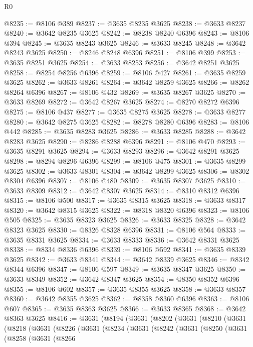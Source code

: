 \begin{lexlean}{R0}
\begin{coremodule}
@8235 := @8106 @389
@8237 := @3635 @8235 @3625
@8238 := @3633 @8237
@8240 := @3642 @8235 @3625
@8242 := @8238 @8240 @6396
@8243 := @8106 @394
@8245 := @3635 @8243 @3625
@8246 := @3633 @8245
@8248 := @3642 @8243 @3625
@8250 := @8246 @8248 @6396
@8251 := @8106 @399
@8253 := @3635 @8251 @3625
@8254 := @3633 @8253
@8256 := @3642 @8251 @3625
@8258 := @8254 @8256 @6396
@8259 := @8106 @427
@8261 := @3635 @8259 @3625
@8262 := @3633 @8261
@8264 := @3642 @8259 @3625
@8266 := @8262 @8264 @6396
@8267 := @8106 @432
@8269 := @3635 @8267 @3625
@8270 := @3633 @8269
@8272 := @3642 @8267 @3625
@8274 := @8270 @8272 @6396
@8275 := @8106 @437
@8277 := @3635 @8275 @3625
@8278 := @3633 @8277
@8280 := @3642 @8275 @3625
@8282 := @8278 @8280 @6396
@8283 := @8106 @442
@8285 := @3635 @8283 @3625
@8286 := @3633 @8285
@8288 := @3642 @8283 @3625
@8290 := @8286 @8288 @6396
@8291 := @8106 @470
@8293 := @3635 @8291 @3625
@8294 := @3633 @8293
@8296 := @3642 @8291 @3625
@8298 := @8294 @8296 @6396
@8299 := @8106 @475
@8301 := @3635 @8299 @3625
@8302 := @3633 @8301
@8304 := @3642 @8299 @3625
@8306 := @8302 @8304 @6396
@8307 := @8106 @480
@8309 := @3635 @8307 @3625
@8310 := @3633 @8309
@8312 := @3642 @8307 @3625
@8314 := @8310 @8312 @6396
@8315 := @8106 @500
@8317 := @3635 @8315 @3625
@8318 := @3633 @8317
@8320 := @3642 @8315 @3625
@8322 := @8318 @8320 @6396
@8323 := @8106 @505
@8325 := @3635 @8323 @3625
@8326 := @3633 @8325
@8328 := @3642 @8323 @3625
@8330 := @8326 @8328 @6396
@8331 := @8106 @564
@8333 := @3635 @8331 @3625
@8334 := @3633 @8333
@8336 := @3642 @8331 @3625
@8338 := @8334 @8336 @6396
@8339 := @8106 @592
@8341 := @3635 @8339 @3625
@8342 := @3633 @8341
@8344 := @3642 @8339 @3625
@8346 := @8342 @8344 @6396
@8347 := @8106 @597
@8349 := @3635 @8347 @3625
@8350 := @3633 @8349
@8352 := @3642 @8347 @3625
@8354 := @8350 @8352 @6396
@8355 := @8106 @602
@8357 := @3635 @8355 @3625
@8358 := @3633 @8357
@8360 := @3642 @8355 @3625
@8362 := @8358 @8360 @6396
@8363 := @8106 @607
@8365 := @3635 @8363 @3625
@8366 := @3633 @8365
@8368 := @3642 @8363 @3625
@8416 := @3631
    (@8194
      (@3631
        (@8202
          (@3631
            (@8210
              (@3631
                (@8218
                  (@3631
                    (@8226
                      (@3631
                        (@8234
                          (@3631
                            (@8242
                              (@3631
                                (@8250
                                  (@3631
                                    (@8258
                                      (@3631
                                        (@8266

\end{coremodule}
\end{lexlean}
